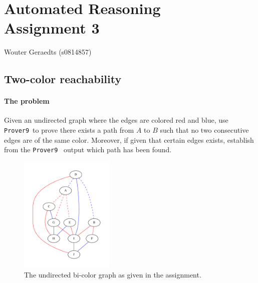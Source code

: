 \documentclass[12pt]{article}
\newcommand{\provernine}{\texttt{Prover9}~}
\begin{document}
\section*{Automated Reasoning\\Assignment 3}

\begin{center}
Wouter Geraedts (s0814857)
\end{center}

\vspace{8mm}

\subsection*{Two-color reachability}

\paragraph{The problem}
Given an undirected graph where the edges are colored red and blue, use
\provernine to prove there exists a path from $A$ to $B$ such that no two
consecutive edges are of the same color.
Moreover, if given that certain edges exists, establish from the \provernine
output which path has been found.
\begin{figure}[h!]
	\begin{center}
		\includegraphics[width=0.4\textwidth]{graph.pdf}
	\end{center}
	\caption{The undirected bi-color graph as given in the assignment.}
\end{figure}
\end{document}
